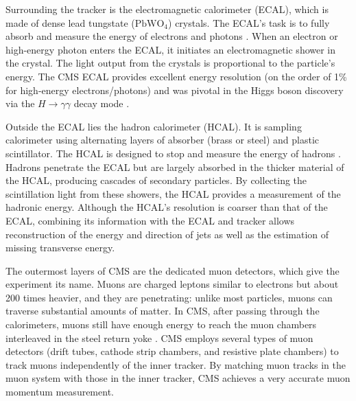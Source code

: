Surrounding the tracker is the electromagnetic calorimeter (ECAL), which is made of dense lead tungstate ($\text{PbWO}_4$) crystals. The ECAL’s task is to fully absorb and measure the energy of electrons and photons \cite{CMS}. When an electron or high-energy photon enters the ECAL, it initiates an electromagnetic shower in the crystal. The light output from the crystals is proportional to the particle’s energy. The CMS ECAL provides excellent energy resolution (on the order of 1\% for high-energy electrons/photons) and was pivotal in the Higgs boson discovery via the $H\to\gamma\gamma$ decay mode \cite{Chatrchyan_2012}.

Outside the ECAL lies the hadron calorimeter (HCAL). It is sampling calorimeter using alternating layers of absorber (brass or steel) and plastic scintillator. The HCAL is designed to stop and measure the energy of hadrons \cite{CMS}. Hadrons penetrate the ECAL but are largely absorbed in the thicker material of the HCAL, producing cascades of secondary particles. By collecting the scintillation light from these showers, the HCAL provides a measurement of the hadronic energy. Although the HCAL’s resolution is coarser than that of the ECAL, combining its information with the ECAL and tracker allows reconstruction of the energy and direction of jets as well as the estimation of missing transverse energy.

The outermost layers of CMS are the dedicated muon detectors, which give the experiment its name. Muons are charged leptons similar to electrons but about 200 times heavier, and they are penetrating: unlike most particles, muons can traverse substantial amounts of matter. In CMS, after passing through the calorimeters, muons still have enough energy to reach the muon chambers interleaved in the steel return yoke \cite{CMS}. CMS employs several types of muon detectors (drift tubes, cathode strip chambers, and resistive plate chambers) to track muons independently of the inner tracker. By matching muon tracks in the muon system with those in the inner tracker, CMS achieves a very accurate muon momentum measurement.

